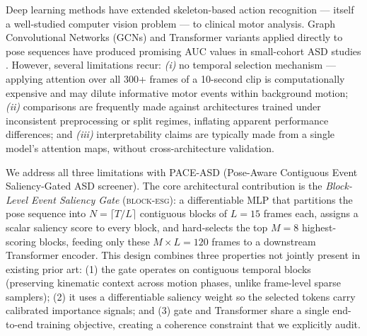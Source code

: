 \documentclass[a4paper,fleqn]{cas-sc}
\newcommand{\besg}{\textsc{block-esg}\xspace}
\begin{document}
Deep learning methods have extended skeleton-based action recognition --- itself
a well-studied computer vision problem --- to clinical motor analysis.
Graph Convolutional Networks (GCNs) \citep{yan2018spatial} and Transformer
variants \citep{plizzari2021skeleton} applied directly to pose sequences have
produced promising AUC values in small-cohort ASD studies
\citep{anzalone2019automatic,raj2021autism}.
However, several limitations recur:
\textit{(i)} no temporal selection mechanism --- applying attention over all
300+ frames of a 10-second clip is computationally expensive and may dilute
informative motor events within background motion;
\textit{(ii)} comparisons are frequently made against architectures trained
under inconsistent preprocessing or split regimes, inflating apparent performance
differences; and
\textit{(iii)} interpretability claims are typically made from a single model's
attention maps, without cross-architecture validation.

We address all three limitations with PACE-ASD (Pose-Aware Contiguous Event
Saliency-Gated ASD screener).
The core architectural contribution is the \textit{Block-Level Event Saliency
Gate} (\besg): a differentiable MLP that partitions the pose sequence into
$N = \lceil T/L \rceil$ contiguous blocks of $L=15$ frames each, assigns a
scalar saliency score to every block, and hard-selects the top $M=8$ highest-
scoring blocks, feeding only these $M \times L = 120$ frames to a downstream
Transformer encoder.
This design combines three properties not jointly present in existing prior art:
(1) the gate operates on contiguous temporal blocks (preserving kinematic
context across motion phases, unlike frame-level sparse samplers); (2) it uses
a differentiable saliency weight so the selected tokens carry calibrated
importance signals; and (3) gate and Transformer share a single end-to-end
training objective, creating a coherence constraint that we explicitly audit.
\end{document}

